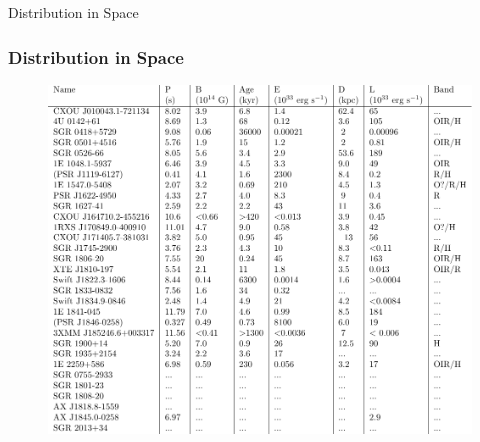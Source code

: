 \documentclass[hyperref=pdftex, presentation]{beamer}
\begin{document}
\begin{frame}{\Large Distribution in Space}
\frametitle{\Large Distribution in Space}

\begin{figure}
	\includegraphics[scale=.5]{tables/magnetar_table.pdf}
\end{figure}

\end{frame}


\end{document}
